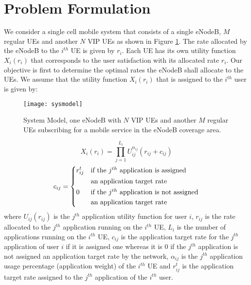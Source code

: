 \documentclass[journal]{IEEEtran} 				\IEEEoverridecommandlockouts 						\usepackage{amsmath,amssymb}
\begin{document}
\section{Problem Formulation}\label{sec:Problem_formulation}
We consider a single cell mobile system that consists of a single eNodeB, $M$ regular UEs and another $N$ VIP UEs as shown in Figure \ref{fig:system_model1}. The rate allocated by the eNodeB to the $i^{th}$ UE is given by $r_i$. Each UE has its own utility function $X_i(r_i)$ that corresponds to the user satisfaction with its allocated rate $r_i$. Our objective is first to determine the optimal rates the eNodeB shall allocate to the UEs. We assume that the utility function $X_i(r_i)$ that is assigned to the $i^{th}$ user is given by:
\begin{figure}
\texttt{[image: sysmodel]}
 \caption{System Model, one eNodeB with $N$ VIP UEs and another $M$ regular UEs subscribing for a mobile service in the eNodeB coverage area.}
 \label{fig:system_model1}
 \end{figure}

\begin{equation}\label{eqn:utility_agg}
X_i(r_i) = \prod_{j=1}^{L_i}U_{ij}^{\alpha_{ij}}(r_{ij}+c_{ij})
\end{equation}
\[
  c_{ij} = \begin{dcases*}
         r_{ij}^{t} & if the $j^{th}$ application is assigned\\
            & an application target rate\\
         0 & if the $j^{th}$ application is not assigned\\
            & an application target rate
         \end{dcases*}
 \]
where $U_{ij}(r_{ij})$ is the $j^{th}$ application utility function for user $i$, $r_{ij}$ is the rate allocated to the $j^{th}$ application running on the $i^{th}$ UE, $L_i$ is the number of applications running on the $i^{th}$ UE, $c_{ij}$ is the application target rate for the $j^{th}$ application of user $i$ if it is assigned one whereas it is $0$ if the $j^{th}$ application is not assigned an application target rate by the network, $\alpha_{ij}$ is the $j^{th}$ application usage percentage (application weight) of the $i^{th}$ UE and $r_{ij}^{t}$ is the application target rate assigned to the $j^{th}$ application of the $i^{th}$ user. 
\end{document}
